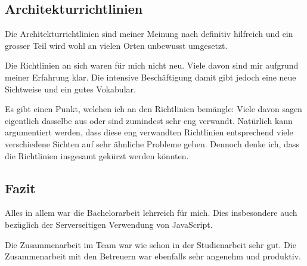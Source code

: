\subsection*{Architekturrichtlinien}
Die Architekturrichtlinien sind meiner Meinung nach definitiv hilfreich und ein grosser Teil wird wohl an vielen Orten unbewusst umgesetzt.

Die Richtlinien an sich waren für mich nicht neu. Viele davon sind mir aufgrund meiner Erfahrung klar. Die intensive Beschäftigung damit gibt jedoch eine neue Sichtweise und ein gutes Vokabular.

Es gibt einen Punkt, welchen ich an den Richtlinien bemängle: Viele davon sagen eigentlich dasselbe aus oder sind zumindest sehr eng verwandt. Natürlich kann argumentiert werden, dass diese eng verwandten Richtlinien entsprechend viele verschiedene Sichten auf sehr ähnliche Probleme geben. Dennoch denke ich, dass die Richtlinien insgesamt gekürzt werden könnten.

\subsection*{Fazit}
Alles in allem war die Bachelorarbeit lehrreich für mich. Dies insbesondere auch bezüglich der Serverseitigen Verwendung von JavaScript.

Die Zusammenarbeit im Team war wie schon in der Studienarbeit sehr gut. Die Zusammenarbeit mit den Betreuern war ebenfalls sehr angenehm und produktiv.
